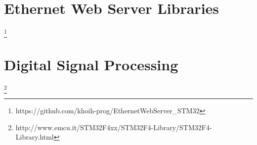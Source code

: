 \documentclass{article}
\begin{document}
\section{Ethernet Web Server Libraries} %
\label{sec:ethernet_web_server_libraries}

\footnote{https://github.com/khoih-prog/EthernetWebServer\_STM32}




\section{Digital Signal Processing} %
\label{sec:digital_signal_processing}

\footnote{http://www.emcu.it/STM32F4xx/STM32F4-Library/STM32F4-Library.html}




\end{document}
